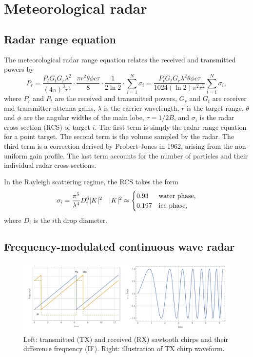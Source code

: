 \documentclass{article}
\DeclarePairedDelimiter\abs{\lvert}{\rvert}%
\begin{document}
\section{Meteorological radar}
\subsection{Radar range equation}
The meteorological radar range equation relates the received and transmitted powers by 
\begin{equation}
	P_r = \frac{P_t G_t G_r \lambda^2}{(4 \pi)^3 r^4} \cdot \frac{\pi r^2 \theta \phi c \tau}{8} \cdot \frac{1}{2\ln{2}} \cdot \sum_{i=1}^N{\sigma_i} = \frac{P_t G_t G_r \lambda^2 \theta \phi c \tau}{1024 (\ln{2}) \pi^2 r^2} \sum_{i=1}^N{\sigma_i}, \label{eqn:MeteoRange}
\end{equation}
where \(P_r\) and \(P_t\) are the received and transmitted powers, \(G_r\) and \(G_t\) are receiver and transmitter attenna gains, \(\lambda\) is the carrier wavelength, \(r\) is the target range, \(\theta\) and \(\phi\) are the angular widths of the main lobe, \(\tau = 1/2B\), and \(\sigma_i\) is the radar cross-section (RCS) of target \(i\).
The first term is simply the radar range equation for a point target. The second term is the volume sampled by the radar. The third term is a correction derived by Probert-Jones in 1962, arising from the non-uniform gain profile.\supercite{ProbertJones} The last term accounts for the number of particles and their individual radar cross-sections.

In the Rayleigh scattering regime, the RCS takes the form
\begin{align}
	\sigma_i = \frac{\pi^5}{\lambda^4} D_i^6 \abs{K}^2 &&
	\abs{K}^2 \approx \begin{cases}
		0.93  & \text{water phase}, \\
		0.197 & \text{ice phase},   \\
	\end{cases}\label{eqn:RCS}
\end{align}
where \(D_i\) is the \(i\)th drop diameter.\supercite{RadarHandbookMeteoRange}

\subsection{Frequency-modulated continuous wave radar}
\begin{figure}
	\includegraphics[width=\textwidth]{chirp}
	\caption{Left: transmitted (TX) and received (RX) sawtooth chirps and their difference frequency (IF). Right: illustration of TX chirp waveform.}
	\label{fig:Chirp}
\end{figure}
\end{document}
